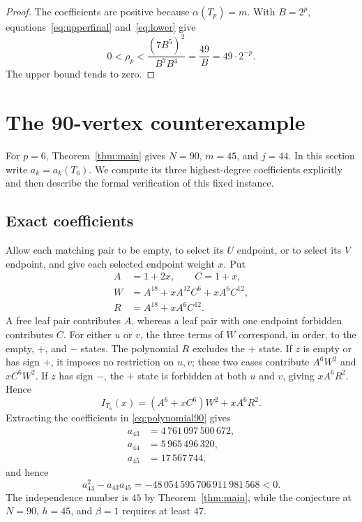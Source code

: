 \documentclass[11pt,a4paper]{article}
\theoremstyle{remark}
\numberwithin{equation}{section}
\begin{document}
\begin{proof}
The coefficients are positive because $\alpha(T_p)=m$.
With $B=2^p$, equations~\eqref{eq:upperfinal} and~\eqref{eq:lower}
give
\[
 0<\rho_p<\frac{(7B^5)^2}{B^7B^4}=\frac{49}{B}=49\cdot2^{-p}.
\]
The upper bound tends to zero.
\end{proof}

\section{The 90-vertex counterexample}\label{sec:formalization}

For $p=6$, Theorem~\ref{thm:main} gives $N=90$, $m=45$, and
$j=44$. In this section write $a_k=a_k(T_6)$.
We compute its three highest-degree coefficients explicitly and then
describe the formal verification of this fixed instance.

\subsection{Exact coefficients}

Allow each matching pair to be empty, to select its $U$ endpoint,
or to select its $V$ endpoint, and give each selected endpoint weight
$x$. Put
\begin{equation}\label{eq:local-polynomials}
\begin{aligned}
 A&=1+2x,\qquad C=1+x,\\
 W&=A^{18}+xA^{12}C^6+xA^6C^{12},\\
 R&=A^{18}+xA^6C^{12}.
\end{aligned}
\end{equation}
A free leaf pair contributes $A$, whereas a leaf pair with one
endpoint forbidden contributes $C$. For either $u$ or $v$, the
three terms of $W$ correspond, in order, to the empty, $+$, and $-$
states. The polynomial $R$ excludes the $+$ state. If $z$ is empty
or has sign $+$, it imposes no restriction on $u,v$; these two cases
contribute $A^6W^2$ and $xC^6W^2$. If $z$ has sign $-$, the $+$
state is forbidden at both $u$ and $v$, giving $xA^6R^2$. Hence
\begin{equation}\label{eq:polynomial90}
 I_{T_6}(x)=(A^6+xC^6)W^2+xA^6R^2.
\end{equation}
Extracting the coefficients in \eqref{eq:polynomial90} gives
\begin{equation}
\begin{aligned}
 a_{43}&=4\,761\,097\,500\,672,\\
 a_{44}&=5\,965\,496\,320,\\
 a_{45}&=17\,567\,744,
\end{aligned}
\label{eq:instance}
\end{equation}
and hence
\begin{equation}\label{eq:instance-difference}
 a_{44}^{2}-a_{43}a_{45}=-48\,054\,595\,706\,911\,981\,568<0.
\end{equation}
The independence number is $45$ by Theorem~\ref{thm:main}, while the conjecture at
$N=90$, $h=45$, and $\beta=1$ requires at least $47$.
\end{document}

